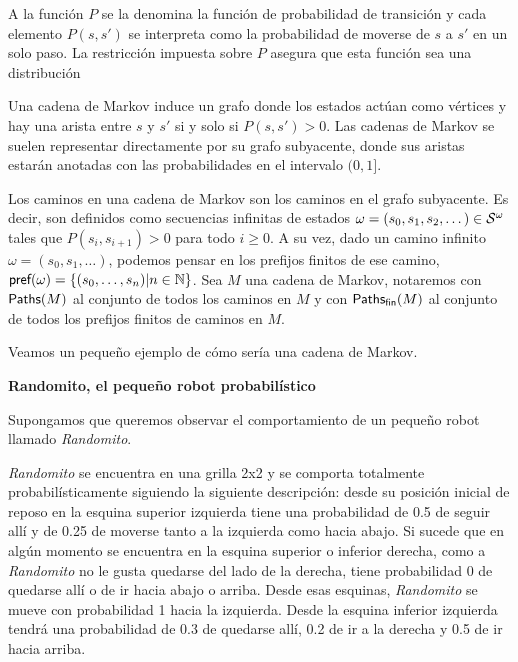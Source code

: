 A la función $P$ se la denomina la función de probabilidad de transición y cada
elemento $P(s, s')$ se interpreta como la probabilidad de moverse de $s$ a $s'$
en un solo paso. La restricción impuesta sobre $P$ asegura que esta función sea
una distribución


Una cadena de Markov induce un grafo donde los estados actúan como vértices y
hay una arista entre $s$ y $s'$ si y solo si $P(s, s') > 0$. Las cadenas de
Markov se suelen representar directamente por su grafo subyacente, donde sus
aristas estarán anotadas con las probabilidades en el intervalo $(0, 1]$.

Los caminos en una cadena de Markov son los caminos en el grafo subyacente. Es
decir, son definidos como secuencias infinitas de estados $\omega = (s_0, s_1,
	s_2, \dots) \in \mathcal{S}^\omega$ tales que $P(s_i, s_{i+1}) > 0 $ para todo $i \geq
	0$. A su vez, dado un camino infinito $\omega = (s_0, s_1, \dots)$, podemos
pensar en los prefijos finitos de ese camino, $\textsf{pref}(\omega) = \{(s_0,
	\dots, s_n) | n \in \mathbb{N}\}$. Sea $M$ una cadena de Markov, notaremos con
$\textsf{Paths}(M)$ al conjunto de todos los caminos en $M$ y con $\textsf{Paths}_\textsf{fin}(M)$ al
conjunto de todos los prefijos finitos de caminos en $M$.

Veamos un pequeño ejemplo de cómo sería una cadena de Markov.

\textbf{Randomito, el pequeño robot probabilístico}

Supongamos que queremos observar el comportamiento de un pequeño robot llamado
\textit{Randomito}.

\textit{Randomito} se encuentra en una grilla 2x2 y se comporta totalmente probabilísticamente siguiendo la siguiente descripción: desde su posición inicial de reposo en la esquina superior izquierda tiene una probabilidad de 0.5 de seguir allí y de 0.25 de moverse tanto a la izquierda como hacia abajo. Si sucede que en algún momento se encuentra en la esquina superior o inferior derecha, como a \emph{Randomito} no le gusta quedarse del lado de la derecha, tiene probabilidad 0 de quedarse allí o de ir hacia abajo o arriba. Desde esas esquinas, \emph{Randomito} se mueve con probabilidad 1 hacia la izquierda. Desde la esquina inferior izquierda tendrá una probabilidad de 0.3 de quedarse allí, 0.2 de ir a la derecha y 0.5 de ir hacia arriba.

